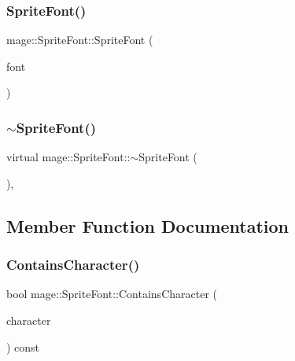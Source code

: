 \subsubsection{\texorpdfstring{Sprite\+Font()}{SpriteFont()}\hspace{0.1cm}{\footnotesize\ttfamily [3/3]}}
{\footnotesize\ttfamily mage\+::\+Sprite\+Font\+::\+Sprite\+Font (\begin{DoxyParamCaption}\item[{\hyperlink{classmage_1_1_sprite_font}{Sprite\+Font} \&\&}]{font }\end{DoxyParamCaption})\hspace{0.3cm}{\ttfamily [default]}}

\hypertarget{classmage_1_1_sprite_font_a76c98e19f7fccb59d55e1995cfc2356a}{}\label{classmage_1_1_sprite_font_a76c98e19f7fccb59d55e1995cfc2356a} 
\subsubsection{\texorpdfstring{$\sim$\+Sprite\+Font()}{~SpriteFont()}}
{\footnotesize\ttfamily virtual mage\+::\+Sprite\+Font\+::$\sim$\+Sprite\+Font (\begin{DoxyParamCaption}{ }\end{DoxyParamCaption})\hspace{0.3cm}{\ttfamily [virtual]}, {\ttfamily [default]}}



\subsection{Member Function Documentation}
\hypertarget{classmage_1_1_sprite_font_a01836c4197661dbdd66c624d8dc6a7c3}{}\label{classmage_1_1_sprite_font_a01836c4197661dbdd66c624d8dc6a7c3} 
\subsubsection{\texorpdfstring{Contains\+Character()}{ContainsCharacter()}}
{\footnotesize\ttfamily bool mage\+::\+Sprite\+Font\+::\+Contains\+Character (\begin{DoxyParamCaption}\item[{wchar\+\_\+t}]{character }\end{DoxyParamCaption}) const}

